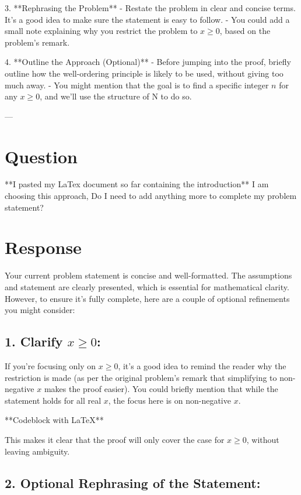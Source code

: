 \documentclass{article}
\begin{document}
3. **Rephrasing the Problem**
   - Restate the problem in clear and concise terms. It’s a good idea to make sure the statement is easy to follow.
   - You could add a small note explaining why you restrict the problem to \( x \geq 0 \), based on the problem’s remark.

4. **Outline the Approach (Optional)**
   - Before jumping into the proof, briefly outline how the well-ordering principle is likely to be used, without giving too much away.
   - You might mention that the goal is to find a specific integer \( n \) for any \( x \geq 0 \), and we’ll use the structure of N to do so.

---

\section*{Question}

**I pasted my LaTex document so far containing the introduction**
I am choosing this approach, Do I need to add anything more to complete my problem statement?

\section*{Response}

Your current problem statement is concise and well-formatted. The assumptions and statement are clearly presented, which is essential for mathematical clarity. However, to ensure it's fully complete, here are a couple of optional refinements you might consider:

\subsection*{1. Clarify \( x \geq 0 \):}

If you're focusing only on \( x \geq 0 \), it's a good idea to remind the reader why the restriction is made (as per the original problem's remark that simplifying to non-negative \( x \) makes the proof easier). You could briefly mention that while the statement holds for all real \( x \), the focus here is on non-negative \( x \).

**Codeblock with LaTeX**

This makes it clear that the proof will only cover the case for \( x \geq 0 \), without leaving ambiguity.

\subsection*{2. Optional Rephrasing of the Statement:}
\end{document}

